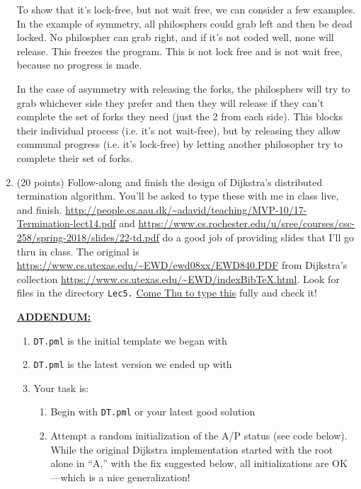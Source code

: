 \documentclass[11pt]{article}
\begin{document}
\begin{enumerate}
\begin{minipage}{\minpagw}
{{      To show that it's lock-free, but not wait free, we can consider a few examples. In the example of symmetry, all philosphers could grab left and then be dead locked. No philospher can grab right, and if it's not coded well, none will release. This freezes the program. This is not lock free and is not wait free, because no progress is made.
      
      In the case of asymmetry with releasing the forks, the philosphers will try to grab whichever side they prefer and then they will release if they can't complete the set of forks they need (just the 2 from each side). This blocks their individual process (i.e. it's not wait-free), but by releasing they allow communal progress (i.e. it's lock-free) by letting another philosopher try to complete their set of forks.
    }%
  }%
\end{minipage}

\clearpage

\item (20 points) Follow-along and finish the design of
  Dijkstra's distributed termination algorithm.
  You'll be asked to type these with me in class live, and
  finish.
  \url{http://people.cs.aau.dk/~adavid/teaching/MVP-10/17-Termination-lect14.pdf}
  and
  \url{https://www.cs.rochester.edu/u/sree/courses/csc-258/spring-2018/slides/22-td.pdf}
  do a good job of providing slides
  that I'll go thru in class.
  The original is
  \url{https://www.cs.utexas.edu/~EWD/ewd08xx/EWD840.PDF}
  from Dijkstra's collection
  \url{https://www.cs.utexas.edu/~EWD/indexBibTeX.html}.
  Look for files in the directory {\tt Lec5.}
  \underline{Come Thu to type this} fully and check it!

  \underline{\bf ADDENDUM:\/}
  \begin{enumerate}
  \item {\tt DT.pml} is the initial template we began with
  \item  {\tt DT\latest.pml} is the latest version we ended up with
  \item Your task is:
    \begin{enumerate}
    \item Begin with {\tt DT\latest.pml} or your latest good solution
    \item Attempt a random initialization of the A/P status (see code below).
      While the original Dijkstra implementation started with the root alone
      in ``A,'' with the fix suggested below, all initializations are OK---which
      is a nice generalization!


\end{enumerate}
\end{enumerate}
\end{enumerate}
\end{document}
